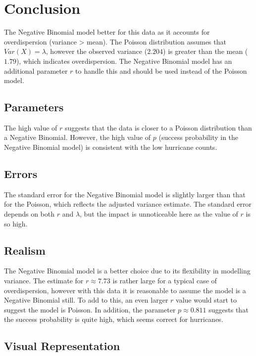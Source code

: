 \documentclass[11pt,spanish]{report}
\begin{document}
    \section{Conclusion}

    The Negative Binomial model better for this data as it accounts for overdispersion (variance > mean). The Poisson distribution assumes that $Var(X)=\lambda$, however the observed variance ($2.204$) is greater than the mean ($1.79$), which indicates overdispersion. The Negative Binomial model has an additional parameter $r$ to handle this and should be used instead of the Poisson model.

    \subsection{Parameters}

    The high value of $r$ suggests that the data is closer to a Poisson distribution than a Negative Binomial. However, the high value of $p$ (success probability in the Negative Binomial model) is consistent with the low hurricane counts.

    \subsection{Errors}
    
    The standard error for the Negative Binomial model is slightly larger than that for the Poisson, which reflects the adjusted variance estimate. The standard error depends on both $r$ and $\lambda$, but the impact is unnoticeable here as the value of $r$ is so high. 

    \subsection{Realism}

    The Negative Binomial model is a better choice due to its flexibility in modelling variance. The estimate for $r\approx7.73$ is rather large for a typical case of overdispersion, however with this data it is reasonable to assume the model is a Negative Binomial still. To add to this, an even larger $r$ value would start to suggest the model is Poisson. In addition, the parameter $p\approx0.811$ suggests that the success probability is quite high, which seems correct for hurricanes.

    \subsection{Visual Representation}
\end{document}
